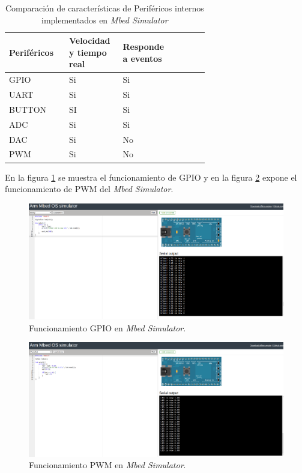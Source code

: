 \begin{table}[h]
\centering
\caption[Comparación de características de periféricos internos implementados en \textit{Mbed Simulator}]{Comparación de características de Periféricos internos implementados en \textit{Mbed Simulator}}
\begin{tabular}{p{0.24\linewidth} p{0.14\linewidth}  p{0.14\linewidth}  p{0.14\linewidth}}
\toprule
\textbf{Periféricos} 
& \textbf{Velocidad y tiempo real}
& \textbf{Responde a eventos}
\\
\midrule
GPIO & Si & Si  \\
UART & Si & Si \\
BUTTON & SI & Si \\
ADC & Si & Si \\
DAC & Si & No \\
PWM & Si & No \\ 
\bottomrule
\hline
\end{tabular}
\label{tab:perifericosInternosMBED}
\end{table}


En la figura \ref{fig:GPIOMbed} se muestra el funcionamiento de GPIO y en la figura \ref{fig:PMWMbed} expone el funcionamiento de PWM del \textit{Mbed Simulator}.



\begin{figure}[ht]
	\centering
	\includegraphics[scale=.28]{./Figures/GPIOMbed.png}
	\caption{Funcionamiento GPIO en \textit{Mbed Simulator}.}
	\label{fig:GPIOMbed}
\end{figure}


\hfill \break
\hfill \break
\hfill \break
\hfill \break
\hfill \break
\hfill \break
\hfill \break
\hfill \break
\hfill \break
\hfill \break
\begin{figure}[ht]
	\centering
	\includegraphics[scale=.24]{./Figures/PMWMbed.png}
	\caption{Funcionamiento PWM en \textit{Mbed Simulator}.}
	\label{fig:PMWMbed}
\end{figure}





